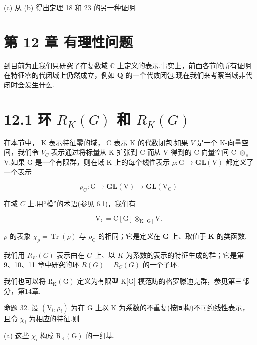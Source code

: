 \documentclass[10pt]{article}
\begin{document}
(c) 从 (b) 得出定理 18 和 23 的另一种证明.

\section*{第 12 章 有理性问题}

到目前为止我们只研究了在复数域 \(\mathbb{C}\) 上定义的表示.事实上，前面各节的所有证明在特征零的代闭域上仍然成立，例如 \(\mathbf{Q}\) 的一个代数闭包.现在我们来考察当域非代闭时会发生什么.

\section*{12.1 环 \({R}_{K}\left( G\right)\) 和 \({\bar{R}}_{K}\left( G\right)\)}

在本节中， \(\mathrm{K}\) 表示特征零的域， \(\mathrm{C}\) 表示 K 的代数闭包.如果 \(V\) 是一个 K-向量空间，我们令 \({V}_{C}\) 表示通过将标量从 K 扩张到 C 而从 V 得到的 C-向量空间 C \({ \otimes  }_{\mathrm{K}}\) V.如果 G 是一个有限群，则在域 \(\mathrm{K}\) 上的每个线性表示 \(\rho  : \mathrm{G} \rightarrow  \mathbf{{GL}}\left( \mathrm{V}\right)\) 都定义了一个表示

\[
{\rho }_{\mathrm{C}} : \mathrm{G} \rightarrow  \mathbf{{GL}}\left( \mathrm{V}\right)  \rightarrow  \mathbf{{GL}}\left( {\mathrm{V}}_{\mathrm{C}}\right)
\]

在域 \(C\) 上.用“模”的术语(参见 6.1)，我们有

\[
{\mathrm{V}}_{\mathrm{C}} = \mathrm{C}\left\lbrack  \mathrm{G}\right\rbrack  { \otimes  }_{\mathrm{K}\left\lbrack  \mathrm{G}\right\rbrack  }\mathrm{V}.
\]

\(\rho\) 的表象 \({\chi }_{\rho } = \operatorname{Tr}\left( \rho \right)\) 与 \({\rho }_{\mathrm{C}}\) 的相同；它是定义在 \(\mathbf{G}\) 上、取值于 \(\mathbf{K}\) 的类函数.

我们用 \({R}_{K}\left( G\right)\) 表示由在 \(G\) 上、以 \(K\) 为系数的表示的特征生成的群；它是第 9、10、11 章中研究的环 \(R\left( G\right)  = {R}_{C}\left( G\right)\) 的一个子环.

我们也可以将 \({\mathrm{R}}_{\mathrm{K}}\left( \mathrm{G}\right)\) 定义为有限型 K[G]-模范畴的格罗滕迪克群，参见第三部分，第14章.

命题 32. 设 \(\left( {{\mathrm{V}}_{i},{\rho }_{i}}\right)\) 为在 \(\mathrm{G}\) 上以 \(\mathrm{K}\) 为系数的不重复(按同构)不可约线性表示，且令 \({\chi }_{i}\) 为相应的特征.则

(a) 这些 \({\chi }_{i}\) 构成 \({\mathrm{R}}_{\mathrm{K}}\left( \mathrm{G}\right)\) 的一组基.
\end{document}
